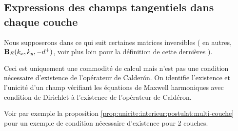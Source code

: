     \subsection{Expressions des champs tangentiels dans chaque couche}

      \begin{remark}
        Nous supposerons dans ce qui suit certaines matrices inversibles ( en autres, \(\mathbf{B}_E(k_x,k_y,-d^+)\), voir plus loin pour la définition de cette dernières ).

        Ceci est uniquement une commodité de calcul mais n'est pas une condition nécessaire d'existence de l'opérateur de Calderón.
        On identifie l'existence et l'unicité d'un champ vérifiant les équations de Maxwell harmoniques avec condition de Dirichlet à l'existence de l'opérateur de Caldéron.

        Voir par exemple la proposition \ref{prop:unicite:interieur:postulat:multi-couche} pour un exemple de condition nécessaire d’existence pour 2 couches.
      \end{remark}

